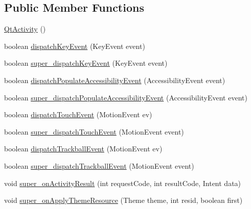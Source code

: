 \subsection*{Public Member Functions}
\begin{DoxyCompactItemize}
\item 
\hyperlink{classorg_1_1qtproject_1_1qt5_1_1android_1_1bindings_1_1_qt_activity_ae7320eeaed590a34a648907cb524f31a}{Qt\+Activity} ()
\item 
boolean \hyperlink{classorg_1_1qtproject_1_1qt5_1_1android_1_1bindings_1_1_qt_activity_a3419f10b60670ae0fd0a222fcd684273}{dispatch\+Key\+Event} (Key\+Event event)
\item 
boolean \hyperlink{classorg_1_1qtproject_1_1qt5_1_1android_1_1bindings_1_1_qt_activity_a0222dd1edd412d5573914d8e563d8dfc}{super\+\_\+dispatch\+Key\+Event} (Key\+Event event)
\item 
boolean \hyperlink{classorg_1_1qtproject_1_1qt5_1_1android_1_1bindings_1_1_qt_activity_a7eacf9d228567bace814d7d90cc88dc1}{dispatch\+Populate\+Accessibility\+Event} (Accessibility\+Event event)
\item 
boolean \hyperlink{classorg_1_1qtproject_1_1qt5_1_1android_1_1bindings_1_1_qt_activity_a174082c8c4aa301a2a8c78ce237bca22}{super\+\_\+dispatch\+Populate\+Accessibility\+Event} (Accessibility\+Event event)
\item 
boolean \hyperlink{classorg_1_1qtproject_1_1qt5_1_1android_1_1bindings_1_1_qt_activity_a080d702cac33de4a97b4645567cf8c04}{dispatch\+Touch\+Event} (Motion\+Event ev)
\item 
boolean \hyperlink{classorg_1_1qtproject_1_1qt5_1_1android_1_1bindings_1_1_qt_activity_a8525630fd66e1d88e94f7bc9457bbd1b}{super\+\_\+dispatch\+Touch\+Event} (Motion\+Event event)
\item 
boolean \hyperlink{classorg_1_1qtproject_1_1qt5_1_1android_1_1bindings_1_1_qt_activity_ad305b6d78907e6fc4bc4fa9b77256a22}{dispatch\+Trackball\+Event} (Motion\+Event ev)
\item 
boolean \hyperlink{classorg_1_1qtproject_1_1qt5_1_1android_1_1bindings_1_1_qt_activity_a84a82b3eb7dd352d126c55272c64264a}{super\+\_\+dispatch\+Trackball\+Event} (Motion\+Event event)
\item 
void \hyperlink{classorg_1_1qtproject_1_1qt5_1_1android_1_1bindings_1_1_qt_activity_a03bf6f3f50c07592cbee97ce9ebdb315}{super\+\_\+on\+Activity\+Result} (int request\+Code, int result\+Code, Intent data)
\item 
void \hyperlink{classorg_1_1qtproject_1_1qt5_1_1android_1_1bindings_1_1_qt_activity_a03b4db053b9528617c37bab2d47fc803}{super\+\_\+on\+Apply\+Theme\+Resource} (Theme theme, int resid, boolean first)

\end{DoxyCompactItemize}
